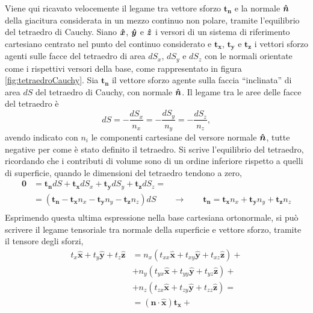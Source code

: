 \begin{example}
Viene qui ricavato velocemente il legame tra vettore sforzo $\bm{t_n}$ e la normale $\bm{\hat{n}}$ della giacitura considerata in un mezzo continuo non polare, tramite l'equilibrio del tetraedro di Cauchy. Siano $\bm{\hat{x}}$, $\bm{\hat{y}}$ e $\bm{\hat{z}}$ i versori di un sistema di riferimento cartesiano centrato nel punto del continuo considerato e $\bm{t_x}$, $\bm{t_y}$ e $\bm{t_z}$ i vettori sforzo agenti sulle facce del tetraedro di area $dS_x$, $dS_y$ e $dS_z$ con le normali orientate come i rispettivi versori della base, come rappresentato in figura \ref{fig:tetraedroCauchy}. Sia $\bm{t_n}$ il vettore sforzo agente sulla faccia ``inclinata'' di area $dS$ del tetraedro di Cauchy, con normale $\bm{\hat{n}}$. Il legame tra le aree delle facce del tetraedro è
\begin{equation}
 dS = - \dfrac{dS_x}{n_x} = - \dfrac{dS_y}{n_y} = - \dfrac{dS_z}{n_z} ,
\end{equation}
avendo indicato con $n_i$ le componenti cartesiane del versore normale $\bm{\hat{n}}$, tutte negative per come è stato definito il tetraedro. Si scrive l'equilibrio del tetraedro, ricordando che i contributi di volume sono di un ordine inferiore rispetto a quelli di superficie, quando le dimensioni del tetraedro tendono a zero,
\begin{equation}
\begin{aligned}
 \bm{0} & = \bm{t_n} dS + \bm{t_x} dS_x + \bm{t_y} dS_y + \bm{t_z} dS_z = \\
  & = ( \bm{t_n} - \bm{t_x} n_x - \bm{t_y} n_y - \bm{t_z} n_z ) dS  \qquad \rightarrow \qquad \bm{t_n} = \bm{t_x} n_x + \bm{t_y} n_y + \bm{t_z} n_z \\
\end{aligned}
\end{equation}
Esprimendo questa ultima espressione nella base cartesiana ortonormale, si può scrivere il legame tensoriale tra normale della superficie e vettore sforzo, tramite il tensore degli sforzi,
\begin{equation}
\begin{aligned}
    t_x \bm{\hat{x}} + t_y \bm{\hat{y}} + t_z \bm{\hat{z}} & = 
   n_x ( t_{xx} \bm{\hat{x}} + t_{xy} \bm{\hat{y}} +  t_{xz} \bm{\hat{z}} ) + \\
 & + n_y ( t_{yx} \bm{\hat{x}} + t_{yy} \bm{\hat{y}} +  t_{yz} \bm{\hat{z}} ) +  \\
 & + n_z ( t_{zx} \bm{\hat{x}} + t_{zy} \bm{\hat{y}} +  t_{zz} \bm{\hat{z}} ) = \\
  & = ( \bm{n} \cdot \bm{\hat{x}} ) \bm{t_x} + 

\end{aligned}
\end{equation}
\end{example}
